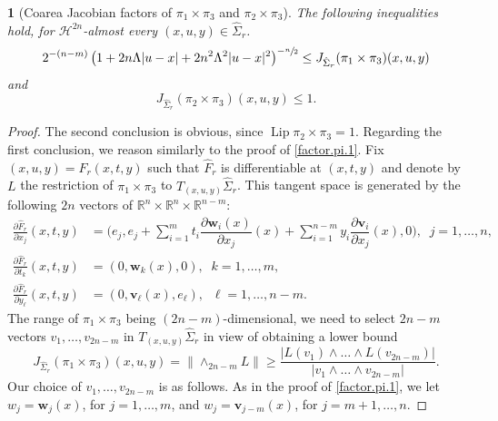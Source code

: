 \documentclass[11pt]{article}
\newcounter{cdrthm}[section]
\theoremstyle{definition}
\theoremstyle{jepanonymous}
\newtheorem{jepempty}[cdrthm]{}
\newenvironment{enonce}[2][remark]{\begin{jepempty}[#2]}{\end{jepempty}}
\theoremstyle{plain}
\newenvironment{Empty}[2][\null]{%
\begin{enonce}[remark]{#1}#2}
{\end{enonce}}
\newcommand{\R}{\mathbb{R}}
\newcommand{\Rn}{\R^n}
\newcommand{\calH}{\mathscr{H}}
\newcommand{\bv}{{\boldsymbol{v}}}
\newcommand{\bw}{{\boldsymbol{w}}}
\DeclareMathOperator{\rmLip}{\mathrm{Lip}}
\begin{document}
\begin{Empty}[Coarea Jacobian factors of $\pi_1 \times \pi_3$ and $\pi_2 \times \pi_3$]
\label{factor}
{\it
The following inequalities hold, for $\calH^{2n}$-almost every $(x,u,y) \in \hat{\Sigma}_r$.
\begin{equation*}
2^{-(n-m)} \left(1 + 2n\Lambda |u-x| + 2n^2 \Lambda^2 |u-x|^2 \right)^{-\sfrac{n}{2}}
\leq J_{\hat{\Sigma}_r} (\pi_1 \times \pi_3)(x,u,y)
\end{equation*}
and
\begin{equation*}
J_{\hat{\Sigma}_r} (\pi_2 \times \pi_3)(x,u,y) \leq 1.
\end{equation*}
}
\end{Empty}

\begin{proof}
The second conclusion is obvious, since $\rmLip \pi_2 \times \pi_3 = 1$.
Regarding the first conclusion, we reason similarly to the proof of \ref{factor.pi.1}.
Fix $(x,u,y) = \hat{F}_r(x,t,y)$ such that $\hat{F}_r$ is differentiable at $(x,t,y)$ and denote by $L$ the restriction of $\pi_1 \times \pi_3$ to $T_{(x,u,y)}\hat{\Sigma}_r$.
This tangent space is generated by the following $2n$ vectors of $\Rn \times \Rn \times \R^{n-m}$:
\begin{equation*}
\begin{split}
\frac{\partial \hat{F}_r}{\partial x_j}(x,t,y) & = \biggl(e_j, e_j + \sum_{i=1}^m t_i \dfrac{\partial \bw_i(x)}{\partial x_j}(x) + \sum_{i=1}^{n-m} y_i \dfrac{\partial \bv_i}{\partial x_j}(x), 0 \biggr),\;\; j=1,\ldots,n, \\
\frac{\partial \hat{F}_r}{\partial t_k}(x,t,y) & =\left(0, \bw_k(x), 0 \right),\;\; k=1,\ldots,m, \\
\frac{\partial \hat{F}_r}{\partial y_\ell}(x,t,y) & = \left(0, \bv_\ell(x), e_\ell \right),\;\; \ell=1,\ldots,n-m.
\end{split}
\end{equation*}
The range of $\pi_1 \times \pi_3$ being $(2n -m)$-dimensional, we need to select $2n-m$ vectors $v_1,\ldots,v_{2n-m}$ in $ T_{(x,u,y)}\hat{\Sigma}_r$ in view of obtaining a lower bound
\begin{equation}
\label{eq.22}
J_{\hat{\Sigma}_r} (\pi_1 \times \pi_3)(x,u,y) = \|{\wedge}_{2n-m} L \| \geq \frac{|L(v_1) \wedge \ldots \wedge L(v_{2n-m})|}{|v_1 \wedge \ldots \wedge v_{2n-m}|}.
\end{equation}
Our choice of $v_1,\ldots,v_{2n-m}$ is as follows.
As in the proof of \ref{factor.pi.1}, we let $w_j=\bw_j(x)$, for $j=1,\ldots,m$, and $w_j=\bv_{j-m}(x)$, for $j=m+1,\ldots,n$.

\end{proof}
\end{document}
